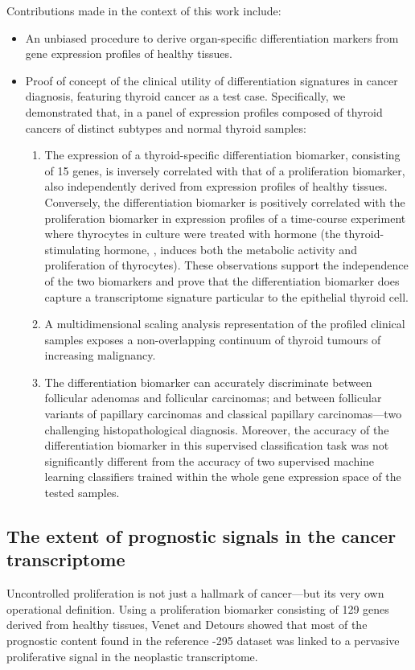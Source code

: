 Contributions made in the context of this work include:
\begin{itemize}{}{}
\item An unbiased procedure to derive \mbox{organ-specific} differentiation
  markers from gene expression profiles of healthy tissues.
\item Proof of concept of the clinical utility of differentiation signatures in
  cancer diagnosis, featuring thyroid cancer as a test case.  Specifically, we
  demonstrated that, in a panel of expression profiles composed of thyroid
  cancers of distinct subtypes and normal thyroid samples:
  \begin{enumerate}
  \item The expression of a \mbox{thyroid-specific} differentiation biomarker,
    consisting of 15 genes, is inversely correlated with that of a proliferation
    biomarker, also independently derived from expression profiles of healthy
    tissues.  Conversely, the differentiation biomarker is positively correlated
    with the proliferation biomarker in expression profiles of a
    \mbox{time-course} experiment where thyrocytes in culture were treated with
     hormone (the \mbox{thyroid-stimulating} hormone,
    , induces both the metabolic activity and proliferation of
    thyrocytes).  These observations support the independence of the two
    biomarkers and prove that the differentiation biomarker does capture a
    transcriptome signature particular to the epithelial thyroid cell.
  \item A multidimensional scaling analysis representation of the profiled
    clinical samples exposes a non-overlapping continuum of thyroid tumours of
    increasing malignancy.
  \item The differentiation biomarker can accurately discriminate between
    follicular adenomas and follicular carcinomas; and between follicular
    variants of papillary carcinomas and classical papillary carcinomas---two
    challenging histopathological diagnosis.  Moreover, the accuracy of the
    differentiation biomarker in this supervised classification task was not
    significantly different from the accuracy of two supervised machine learning
    classifiers trained within the whole gene expression space of the tested
    samples.
  \end{enumerate}
\end{itemize}

\subsection{The extent of prognostic signals in the cancer transcriptome}
Uncontrolled proliferation is not just a hallmark of
cancer\cite{hanahan_hallmarks_2011}---but its very own operational definition.
Using a proliferation biomarker consisting of 129 genes derived from healthy
tissues, Venet and Detours\cite{venet_most_2011} showed that most of the
prognostic content found in the reference -295 dataset was
linked to a pervasive proliferative signal in the neoplastic transcriptome.

